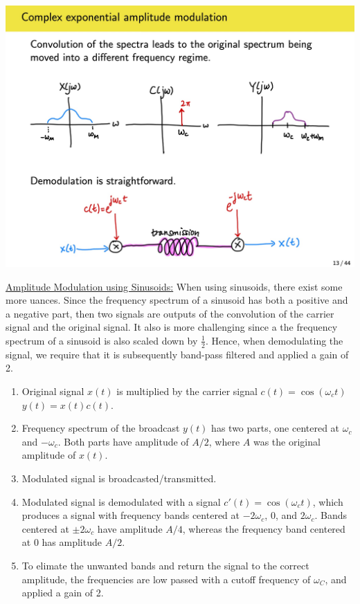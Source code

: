 \documentclass{article}
\newcommand{\sheader}[1]{\underline{#1:}}
\begin{document}
\includegraphics[scale=0.13]{exponential-modulation.jpg}
\pagebreak


\sheader{Amplitude Modulation using Sinusoids} When using sinusoids, there exist some 
more uances. Since the frequency spectrum of a sinusoid has both a positive and 
a negative part, then two signals are outputs of the convolution of the carrier signal 
and the original signal. It also is more challenging since a the frequency spectrum of a 
sinusoid is also scaled down by $\frac{1}{2}$. Hence, when demodulating the signal,
we require that it is subsequently band-pass filtered and applied a gain of 2.

\begin{enumerate}
    \item Original signal $x(t)$ is multiplied by the carrier signal $c(t) = \cos(\omega_c t)$ $y(t) = x(t)c(t)$.
    \item Frequency spectrum of the broadcast $y(t)$ has two parts, one centered at $\omega_c$ and $-\omega_c$. 
    Both parts have amplitude of $A/2$, where $A$ was the original amplitude of $x(t)$.
    \item Modulated signal is broadcasted/transmitted.
    \item Modulated signal is demodulated with a signal $c'(t) = \cos(\omega_c t)$, which
    produces a signal with frequency bands centered at $-2\omega_c$, $0$, and $2\omega_c$.
    Bands centered at $\pm 2\omega_c$ have amplitude $A/4$, whereas the frequency band 
    centered at $0$ has amplitude $A/2$.
    \item To elimate the unwanted bands and return the signal to the correct amplitude, 
    the frequencies are low passed with a cutoff frequency of $\omega_C$, and 
    applied a gain of 2.
\end{enumerate}
\end{document}
